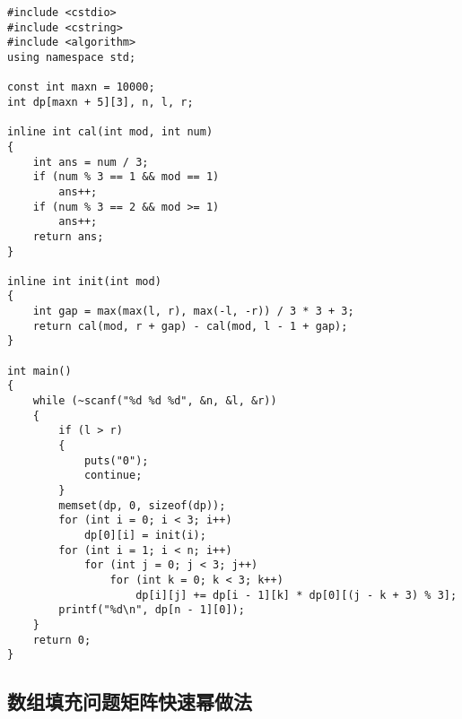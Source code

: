 \documentclass{article}
\begin{document}
\begin{lstlisting}
#include <cstdio>
#include <cstring>
#include <algorithm>
using namespace std;

const int maxn = 10000;
int dp[maxn + 5][3], n, l, r;

inline int cal(int mod, int num)
{
    int ans = num / 3;
    if (num % 3 == 1 && mod == 1)
        ans++;
    if (num % 3 == 2 && mod >= 1)
        ans++;
    return ans;
}

inline int init(int mod)
{
    int gap = max(max(l, r), max(-l, -r)) / 3 * 3 + 3;
    return cal(mod, r + gap) - cal(mod, l - 1 + gap);
}

int main()
{
    while (~scanf("%d %d %d", &n, &l, &r))
    {
        if (l > r)
        {
            puts("0");
            continue;
        }
        memset(dp, 0, sizeof(dp));
        for (int i = 0; i < 3; i++)
            dp[0][i] = init(i);
        for (int i = 1; i < n; i++)
            for (int j = 0; j < 3; j++)
                for (int k = 0; k < 3; k++)
                    dp[i][j] += dp[i - 1][k] * dp[0][(j - k + 3) % 3];
        printf("%d\n", dp[n - 1][0]);
    }
    return 0;
}
\end{lstlisting}

\subsection{数组填充问题矩阵快速幂做法}
\end{document}
